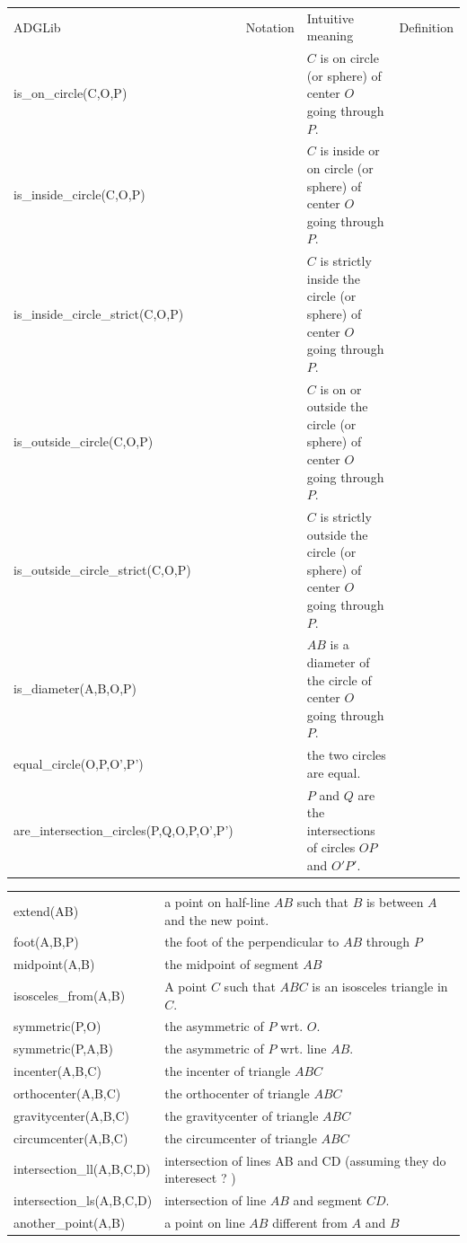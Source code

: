 \documentclass[a4wide,9pt,landscape]{article}
\begin{document}
\noindent\hspace{-75mm}
\begin{tabularx}{270mm}{>{\ttfamily}llXX}
\toprule
ADGLib & Notation & Intuitive meaning & Definition \\
is\_on\_circle(C,O,P) & & $C$ is on circle (or sphere) of center $O$ going through $P$.  \\
is\_inside\_circle(C,O,P) & & $C$ is inside or on circle (or sphere) of center $O$ going through $P$.\\
is\_inside\_circle\_strict(C,O,P) & & $C$ is strictly inside the circle (or sphere) of center $O$ going through $P$.\\
is\_outside\_circle(C,O,P) & & $C$ is on or outside the circle (or sphere) of center $O$ going through $P$.\\
is\_outside\_circle\_strict(C,O,P) & & $C$ is strictly outside the circle (or sphere) of center $O$ going through $P$.\\
is\_diameter(A,B,O,P) & & $AB$ is a diameter of the circle of center $O$ going through $P$. \\
equal\_circle(O,P,O',P') & & the two circles are equal. \\
are\_intersection\_circles(P,Q,O,P,O',P') & & $P$ and $Q$ are the intersections of circles $OP$ and $O'P'$. \\

\bottomrule
\end{tabularx}

\noindent \hspace{-50mm}
\begin{tabularx}{270mm}{>{\ttfamily}lX}
\toprule
extend(AB) & a point on half-line $AB$ such that $B$ is between $A$ and the new point. \\
foot(A,B,P) & the foot of the perpendicular to $AB$ through $P$ \\
midpoint(A,B) & the midpoint of segment $AB$ \\
isosceles\_from(A,B) & A point $C$ such that $ABC$ is an isosceles triangle in $C$. \\
symmetric(P,O) & the asymmetric of $P$ wrt. $O$. \\
symmetric(P,A,B) & the asymmetric of $P$ wrt. line $AB$. \\
incenter(A,B,C) & the incenter of triangle $ABC$ \\
orthocenter(A,B,C) & the orthocenter of triangle $ABC$ \\
gravitycenter(A,B,C) & the gravitycenter of triangle $ABC$ \\
circumcenter(A,B,C) & the circumcenter of triangle $ABC$\\
intersection\_ll(A,B,C,D) & intersection of lines AB and CD (assuming they do interesect ? ) \\
intersection\_ls(A,B,C,D) & intersection of line $AB$ and segment $CD$. \\

another\_point(A,B) & a point on line $AB$ different from $A$ and $B$ \\

\bottomrule
\end{tabularx}



\end{document}
